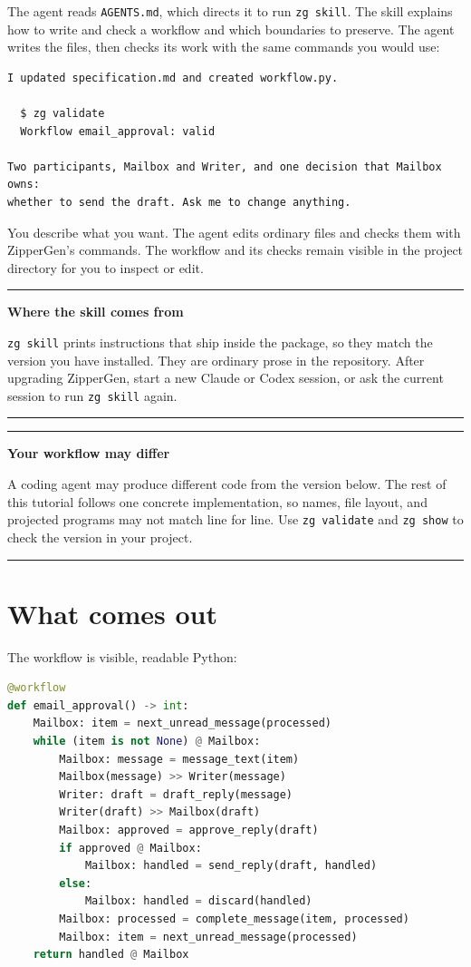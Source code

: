 \documentclass[11pt,a4paper]{article}
\newenvironment{notebox}[1]
{\begin{center}\begin{minipage}{0.94\linewidth}
 \color{ZipperInk}\hrule\vspace{5pt}\textbf{#1}\par\smallskip}
{\vspace{5pt}\hrule\end{minipage}\end{center}}
\begin{document}
The agent reads \texttt{AGENTS.md}, which directs it to run \texttt{zg skill}.
The skill explains how to write and check a workflow and which boundaries to
preserve. The agent writes the files, then checks its work with the same
commands you would use:

\begin{lstlisting}[style=agent]
I updated specification.md and created workflow.py.

  $ zg validate
  Workflow email_approval: valid

Two participants, Mailbox and Writer, and one decision that Mailbox owns:
whether to send the draft. Ask me to change anything.
\end{lstlisting}

You describe what you want. The agent edits ordinary files and checks them with
ZipperGen's commands. The workflow and its checks remain visible in the project
directory for you to inspect or edit.

\begin{notebox}{Where the skill comes from}
\texttt{zg skill} prints instructions that ship inside the package, so they
match the version you have installed. They are ordinary prose in the
repository. After upgrading ZipperGen, start a new Claude or Codex session, or
ask the current session to run \texttt{zg skill} again.
\end{notebox}

\begin{notebox}{Your workflow may differ}
A coding agent may produce different code from the version below. The rest of
this tutorial follows one concrete implementation, so names, file layout, and
projected programs may not match line for line. Use \texttt{zg validate} and
\texttt{zg show} to check the version in your project.
\end{notebox}

\section{What comes out}

The workflow is visible, readable Python:

\begin{lstlisting}[language=Python]
@workflow
def email_approval() -> int:
    Mailbox: item = next_unread_message(processed)
    while (item is not None) @ Mailbox:
        Mailbox: message = message_text(item)
        Mailbox(message) >> Writer(message)
        Writer: draft = draft_reply(message)
        Writer(draft) >> Mailbox(draft)
        Mailbox: approved = approve_reply(draft)
        if approved @ Mailbox:
            Mailbox: handled = send_reply(draft, handled)
        else:
            Mailbox: handled = discard(handled)
        Mailbox: processed = complete_message(item, processed)
        Mailbox: item = next_unread_message(processed)
    return handled @ Mailbox
\end{lstlisting}
\end{document}
